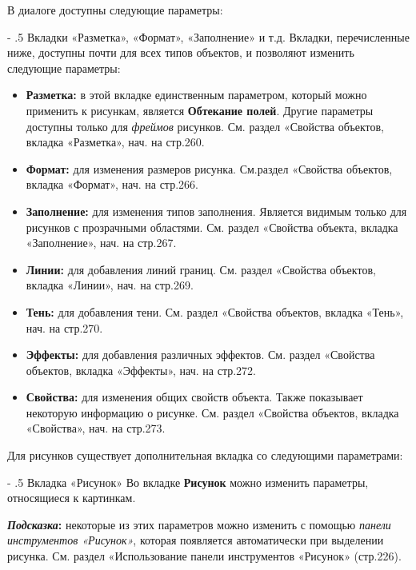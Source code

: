 \documentclass[a4paper,10pt]{article}
\makeatletter
\renewcommand\paragraph{%
   \@startsection{paragraph}{4}{0mm}%
      {-\baselineskip}%
      {.5\baselineskip}%
      {\normalfont\normalsize\bfseries}}
\makeatother
\begin{document}
В диалоге доступны следующие параметры:

\paragraph{Вкладки «Разметка», «Формат», «Заполнение» и т.д.}
Вкладки, перечисленные ниже, доступны почти для всех типов объектов, и позволяют изменить следующие параметры:

\begin{itemize}
 \item \textbf{Разметка:} в этой вкладке единственным параметром, который можно применить к рисункам, является \textbf{Обтекание полей}. Другие параметры доступны только для \textit{фреймов} рисунков. См. раздел «Свойства объектов, вкладка «Разметка», нач. на стр.260.
 \item \textbf{Формат:} для изменения размеров рисунка. См.раздел «Свойства объектов, вкладка «Формат», нач. на стр.266.
 \item \textbf{Заполнение:} для изменения типов заполнения. Является видимым только для рисунков с прозрачными областями. См. раздел «Свойства объекта, вкладка «Заполнение», нач. на стр.267.
 \item \textbf{Линии:} для добавления линий границ. См. раздел «Свойства объектов, вкладка «Линии», нач. на стр.269.
 \item \textbf{Тень:} для добавления тени. См. раздел «Свойства объектов, вкладка «Тень», нач. на стр.270.
 \item \textbf{Эффекты:} для добавления  различных эффектов. См. раздел «Свойства объектов, вкладка «Эффекты», нач. на стр.272.
 \item \textbf{Свойства:} для изменения общих свойств объекта. Также показывает некоторую информацию о рисунке. См. раздел «Свойства объектов, вкладка «Свойства», нач. на стр.273.
\end{itemize}

Для рисунков существует дополнительная вкладка со следующими параметрами:

\paragraph{Вкладка «Рисунок»}
Во вкладке \textbf{Рисунок} можно изменить параметры, относящиеся к картинкам.

\begin{mdframed}[backgroundcolor=blue!10]
\textbf{\textit{Подсказка}:} некоторые из этих параметров можно изменить с помощью \textit{панели инструментов «Рисунок»}, которая появляется автоматически при выделении рисунка. См. раздел  «Использование панели инструментов «Рисунок» (стр.226).
\end{mdframed}
\end{document}
